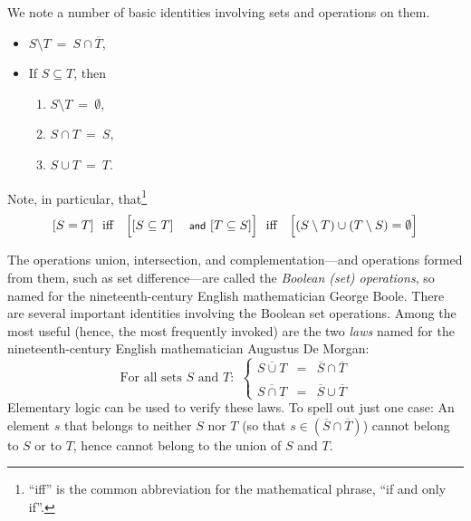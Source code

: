\bigskip

\noindent
We note a number of basic identities involving sets and operations on them.
\begin{itemize}
\item
$S \setminus T \ = \ S \cap \overline{T}$,
\medskip\item
If $S \subseteq T$, then
  \begin{enumerate}
  \item
$S \setminus T \ = \ \emptyset$,
  \medskip\item
$S \cap T \ = \ S$,
  \medskip\item
$S \cup T \ = \ T$.
  \end{enumerate}
\end{itemize}
Note, in particular, that\footnote{``iff'' is the common abbreviation for the mathematical phrase, ``if and only if''.}
\[ [S = T] \ \mbox{  iff  } \ \ \Bigl[[S \subseteq T] \mbox{
    {\small\sf and} } [T \subseteq S]\Bigr] \ \mbox{  iff  }
\ \ \Bigl[ (S \setminus T) \cup (T \setminus S) = \emptyset\Bigr]
\]

\medskip

 
 
 
The operations union, intersection, and complementation---and operations formed from them, such as set difference---are called the {\em Boolean (set) operations}, so named for the
nineteenth-century English mathematician George Boole.  There are several important identities involving the Boolean set operations.  Among the most useful (hence, the most frequently invoked) are the two {\em laws} named for the nineteenth-century English mathematician Augustus De Morgan:
\begin{equation}
\label{e.de-morgan}
\mbox{For all sets $S$ and $T$: } \ \left\{
\begin{array}{lcl}
\overline{S \cup T} & = & \overline{S} \cap \overline{T} \\
 \\
\overline{S \cap T} & = & \overline{S} \cup \overline{T}
\end{array}
\right.
\end{equation}
Elementary logic can be used to verify these laws.  To spell out just one case: An element $s$ that belongs to neither $S$ nor $T$ (so that $s \in \left(\overline{S} \cap \overline{T}\right)$) cannot belong to $S$ or to $T$, hence cannot belong to the union of $S$ and $T$.

